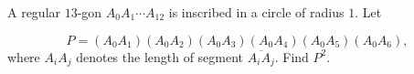A regular $13$-gon $A_0A_1\cdots A_{12}$ is inscribed in a circle of radius $1$. Let

\[
        P=(A_0A_1)(A_0A_2)(A_0A_3)(A_0A_4)(A_0A_5)(A_0A_6),
    \]where $A_iA_j$ denotes the length of segment $\overline{A_iA_j}$. Find $P^2$.
